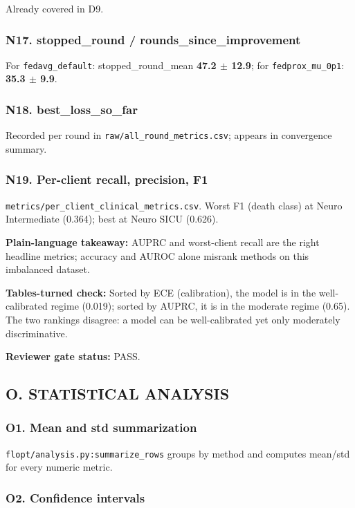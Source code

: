 \documentclass{article}
\begin{document}
Already covered in D9.


\subsubsection{N17. stopped\_round / rounds\_since\_improvement}


For \texttt{fedavg\_default}: stopped\_round\_mean \textbf{47.2 \ensuremath{\pm} 12.9}; for \texttt{fedprox\_mu\_0p1}: \textbf{35.3 \ensuremath{\pm} 9.9}.


\subsubsection{N18. best\_loss\_so\_far}


Recorded per round in \texttt{raw/all\_round\_metrics.csv}; appears in convergence summary.


\subsubsection{N19. Per-client recall, precision, F1}


\texttt{metrics/per\_client\_clinical\_metrics.csv}. Worst F1 (death class) at Neuro Intermediate (0.364); best at Neuro SICU (0.626).


\textbf{Plain-language takeaway:} AUPRC and worst-client recall are the right headline metrics; accuracy and AUROC alone misrank methods on this imbalanced dataset.


\textbf{Tables-turned check:} Sorted by ECE (calibration), the model is in the well-calibrated regime (0.019); sorted by AUPRC, it is in the moderate regime (0.65). The two rankings disagree: a model can be well-calibrated yet only moderately discriminative.


\textbf{Reviewer gate status:} PASS.


\subsection{O. STATISTICAL ANALYSIS}


\subsubsection{O1. Mean and std summarization}


\texttt{flopt/analysis.py:summarize\_rows} groups by method and computes mean/std for every numeric metric.


\subsubsection{O2. Confidence intervals}
\end{document}
